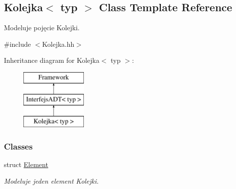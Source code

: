 \hypertarget{class_kolejka}{\subsection{Kolejka$<$ typ $>$ Class Template Reference}
\label{class_kolejka}
}


Modeluje pojęcie Kolejki.  




{\ttfamily \#include $<$Kolejka.\-hh$>$}

Inheritance diagram for Kolejka$<$ typ $>$\-:\begin{figure}[H]
\begin{center}
\leavevmode
\includegraphics[height=3.000000cm]{class_kolejka}
\end{center}
\end{figure}
\subsubsection*{Classes}
\begin{DoxyCompactItemize}
\item 
struct \hyperlink{struct_kolejka_1_1_element}{Element}
\begin{DoxyCompactList}\small\item\em Modeluje jeden element Kolejki. \end{DoxyCompactList}\end{DoxyCompactItemize}
